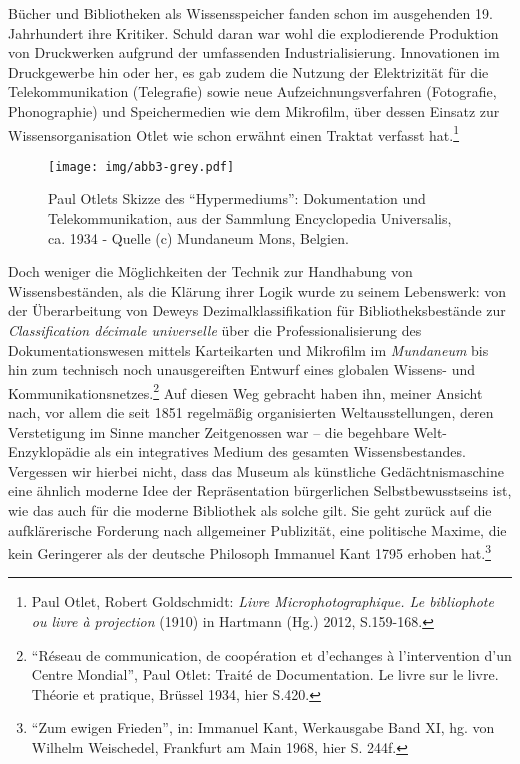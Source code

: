 Bücher und Bibliotheken als Wissensspeicher fanden schon im ausgehenden
19. Jahrhundert ihre Kritiker. Schuld daran war wohl die explodierende
Produktion von Druckwerken aufgrund der umfassenden Industrialisierung.
Innovationen im Druckgewerbe hin oder her, es gab zudem die Nutzung der
Elektrizität für die Telekommunikation (Telegrafie) sowie neue
Aufzeichnungsverfahren (Fotografie, Phonographie) und Speichermedien wie
dem Mikrofilm, über dessen Einsatz zur Wissensorganisation Otlet wie
schon erwähnt einen Traktat verfasst hat.\footnote{Paul Otlet, Robert
  Goldschmidt: \emph{Livre Microphotographique. Le bibliophote ou livre
  à projection} (1910) in Hartmann (Hg.) 2012, S.159-168.}

\begin{figure}[htbp]
\centering
\texttt{[image: img/abb3-grey.pdf]}
\caption*{Paul Otlets Skizze des \enquote{Hypermediums}: Dokumentation
und Telekommunikation, aus der Sammlung Encyclopedia Universalis, ca.
1934 - Quelle (c) Mundaneum Mons, Belgien.}
\end{figure}

Doch weniger die Möglichkeiten der Technik zur Handhabung von
Wissensbeständen, als die Klärung ihrer Logik wurde zu seinem
Lebenswerk: von der Überarbeitung von Deweys Dezimalklassifikation für
Bibliotheksbestände zur \emph{Classification décimale universelle} über
die Professionalisierung des Dokumentationswesen mittels Karteikarten
und Mikrofilm im \emph{Mundaneum} bis hin zum technisch noch
unausgereiften Entwurf eines globalen Wissens- und
Kommunikationsnetzes.\footnote{\enquote{Réseau de communication, de
  coopération et d'echanges à l'intervention d'un Centre Mondial}, Paul
  Otlet: Traité de Documentation. Le livre sur le livre. Théorie et
  pratique, Brüssel 1934, hier S.420.} Auf diesen Weg gebracht haben
ihn, meiner Ansicht nach, vor allem die seit 1851 regelmäßig
organisierten Weltausstellungen, deren Verstetigung im Sinne mancher
Zeitgenossen war -- die begehbare Welt-Enzyklopädie als ein integratives
Medium des gesamten Wissensbestandes. Vergessen wir hierbei nicht, dass
das Museum als künstliche Gedächtnismaschine eine ähnlich moderne Idee
der Repräsentation bürgerlichen Selbstbewusstseins ist, wie das auch für
die moderne Bibliothek als solche gilt. Sie geht zurück auf die
aufklärerische Forderung nach allgemeiner Publizität, eine politische
Maxime, die kein Geringerer als der deutsche Philosoph Immanuel Kant
1795 erhoben hat.\footnote{\enquote{Zum ewigen Frieden}, in: Immanuel
  Kant, Werkausgabe Band XI, hg. von Wilhelm Weischedel, Frankfurt am
  Main 1968, hier S. 244f.}

